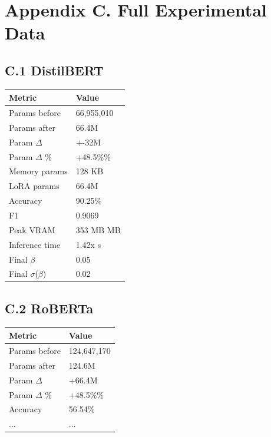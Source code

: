 
\section{Appendix C. Full Experimental Data}

\subsection{C.1 DistilBERT}

\begin{table}[H]
\centering
\small
\begin{tabular}{ll}
\toprule
\textbf{Metric} & \textbf{Value} \\
\midrule
Params before & 66,955,010 \\
Params after & 66.4M \\
Param $\Delta$ & +-32M \\
Param $\Delta$ \% & +48.5\%\% \\
Memory params & 128 KB \\
LoRA params & 66.4M \\
Accuracy & 90.25\% \\
F1 & 0.9069 \\
Peak VRAM & 353 MB MB \\
Inference time & 1.42x s \\
Final $\beta$ & 0.05 \\
Final $\sigma$($\beta$) & 0.02 \\
\bottomrule
\end{tabular}
\end{table}

\subsection{C.2 RoBERTa}

\begin{table}[H]
\centering
\small
\begin{tabular}{ll}
\toprule
\textbf{Metric} & \textbf{Value} \\
\midrule
Params before & 124,647,170 \\
Params after & 124.6M \\
Param $\Delta$ & +66.4M \\
Param $\Delta$ \% & +48.5\%\% \\
Accuracy & 56.54\% \\
... & ... \\
\bottomrule
\end{tabular}
\end{table}

